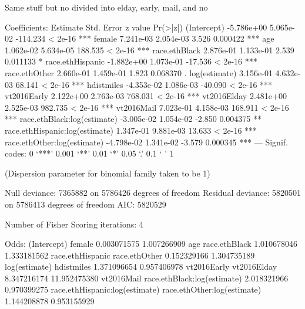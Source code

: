 Same stuff but no divided into elday, early, mail, and no


Coefficients:
                                 Estimate Std. Error  z value Pr(>|z|)
(Intercept)                    -5.786e+00  5.065e-02 -114.234  < 2e-16 ***
female                          7.241e-03  2.054e-03    3.526 0.000422 ***
age                             1.062e-02  5.634e-05  188.535  < 2e-16 ***
race.ethBlack                   2.876e-01  1.133e-01    2.539 0.011133 *
race.ethHispanic               -1.882e+00  1.073e-01  -17.536  < 2e-16 ***
race.ethOther                   2.660e-01  1.459e-01    1.823 0.068370 .
log(estimate)                   3.156e-01  4.632e-03   68.141  < 2e-16 ***
hdistmiles                     -4.353e-02  1.086e-03  -40.090  < 2e-16 ***
vt2016Early                     2.122e+00  2.763e-03  768.031  < 2e-16 ***
vt2016Elday                     2.481e+00  2.525e-03  982.735  < 2e-16 ***
vt2016Mail                      7.023e-01  4.158e-03  168.911  < 2e-16 ***
race.ethBlack:log(estimate)    -3.005e-02  1.054e-02   -2.850 0.004375 **
race.ethHispanic:log(estimate)  1.347e-01  9.881e-03   13.633  < 2e-16 ***
race.ethOther:log(estimate)    -4.798e-02  1.341e-02   -3.579 0.000345 ***
---
Signif. codes:  0 ‘***’ 0.001 ‘**’ 0.01 ‘*’ 0.05 ‘.’ 0.1 ‘ ’ 1

(Dispersion parameter for binomial family taken to be 1)

    Null deviance: 7365882  on 5786426  degrees of freedom
Residual deviance: 5820501  on 5786413  degrees of freedom
AIC: 5820529

Number of Fisher Scoring iterations: 4


Odds:
(Intercept)                         female
                   0.003071575                    1.007266909
                           age                  race.ethBlack
                   1.010678046                    1.333181562
              race.ethHispanic                  race.ethOther
                   0.152329166                    1.304735189
                 log(estimate)                     hdistmiles
                   1.371096654                    0.957406978
                   vt2016Early                    vt2016Elday
                   8.347216174                   11.952475380
                    vt2016Mail    race.ethBlack:log(estimate)
                   2.018321966                    0.970399275
race.ethHispanic:log(estimate)    race.ethOther:log(estimate)
                   1.144208878                    0.953155929

